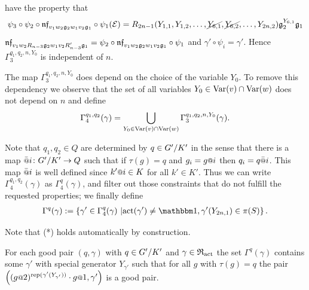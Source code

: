 \documentclass[a4paper,11pt]{amsart}
\begin{document}
have the property that 
\[\psi_3\circ \psi_2\circ\mathfrak{nf}_{v_1w_2\mathfrak g_2w_1v_2\mathfrak g_1}\circ
\psi_1(
\mathcal{E})
=R_{2n-1}(Y_{1,1},Y_{1,2},\ldots,\cancel{Y_{6,1}},\cancel{Y_{6,2}},\ldots,Y_
{2n,2})\mathfrak{g}_2^{Y_{6,1}}\mathfrak{g}_1\]
$\mathfrak{nf}_{v_1w_2R_{n-3}\mathfrak g_2w_1v_2R_{n-3}'\mathfrak g_1} =
\psi_2\circ\mathfrak{nf}_{v_1w_2\mathfrak g_2w_1v_2\mathfrak g_1}\circ \psi_1$ and
$\gamma' \circ \psi_i = \gamma'$. Hence $\Gamma_3^{q_1,q_2,n,Y_0}$ is
independent of $n$.
 
The map $\Gamma_3^{q_1,q_2,n,Y_0}$ does depend on the choice of the
variable $Y_0$.  To remove this dependency we observe that the set of
all variables $Y_0 \in \textup{Var}(v)\cap \textup{Var}(w)$ does not depend on $n$ and
define
\[\Gamma_4^{q_1,q_2}(\gamma)=  \bigcup_{Y_0\in \textup{Var}(v)\cap\textup{Var}(w)}
\Gamma_3^{q_1,q_2,n,Y_0}(\gamma).\]

Note that $q_{1},q_2\in Q$ are determined by $q\in{G'/K'}$ in the
sense that there is a map $\att{i}\colon \RNK{G'}{K'}\to Q$ such that
if $\tau(g) = q$ and $g_i=g\at{i}$ then $q_i = q\att{i}$. This map $\att{i}$ is well defined since $k'\at{i}\in K$ for all $k'\in K'$. Thus we can write
$\Gamma_4^{q_1,q_2}(\gamma)$ as $\Gamma_4^q(\gamma)$, and filter out
those constraints that do not fulfill the requested properties; we
finally define
 \begin{align}
 \Gamma^q(\gamma) := \left\{\gamma' \in \Gamma_4^q(\gamma) \bigmid 
  \act(\gamma')\neq\id, \gamma'({Y_{2n,1}}) \in \pi(S) \right\}. 
  \label{def:Gammaq}
 \end{align}

Note that (*) holds automatically by construction.
\begin{pro}\label{pro:existsNextPair}
 For each good pair $(q,\gamma)$ with $q\in{G'/K'}$ and $\gamma\in\mathfrak{R}_{\operatorname{act}}$ the set $\Gamma^q(\gamma)$ 
 contains some $\gamma'$ with special generator $Y_{\gamma'}$ such that for all $g$ with $\tau(g)=q$ the
 pair $\left((g\at{2})^{\rep(\gamma'(Y_{\gamma'}))}\cdot g\at{1},\gamma'\right)$ is a good pair.
\end{pro}
\end{document}
